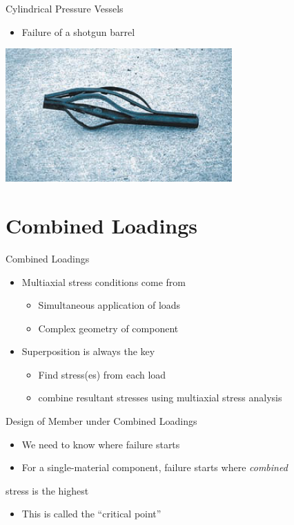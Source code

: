 \documentclass[10pt, svgnames]{beamer}
\begin{document}
\begin{frame}[label={sec:orgd03a07b}]{Cylindrical Pressure Vessels}
\begin{itemize}
\item Failure of a shotgun barrel
\end{itemize}

\begin{center}
\includegraphics[width=.9\linewidth]{./pictures/shotgun-barrel.png}
\end{center}
\end{frame}

\section{Combined Loadings}
\label{sec:org7aba644}

\begin{frame}[label={sec:org4e2c261}]{Combined Loadings}
\begin{itemize}
\item Multiaxial stress conditions come from
\begin{itemize}
\item Simultaneous application of loads
\item Complex geometry of component
\end{itemize}
\item Superposition is always the key
\begin{itemize}
\item Find stress(es) from each load
\item combine resultant stresses using multiaxial stress analysis
\end{itemize}
\end{itemize}
\end{frame}

\begin{frame}[label={sec:orgd74f7f0}]{Design of Member under Combined Loadings}
\begin{itemize}
\item We need to know where failure starts
\item For a single-material component, failure starts where \emph{combined}
\end{itemize}
stress is the highest
\begin{itemize}
\item This is called the ``critical point''
\end{itemize}
\end{frame}
\end{document}
